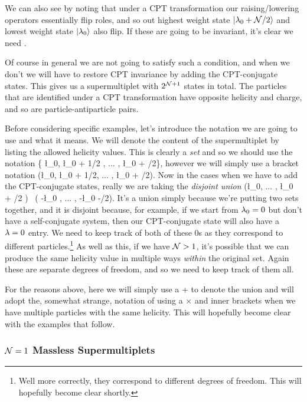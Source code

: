 \br 
    We can also see  by noting that under a CPT transformation our raising/lowering operators essentially flip roles, and so out highest weight state $\ket{\lambda_0 + \mathcal{N}/2}$ and lowest weight state $\ket{\lambda_0}$ also flip. If these are going to be invariant, it's clear we need .
\er 

Of course in general we are not going to satisfy such a condition, and when we don't we will have to restore CPT invariance by adding the CPT-conjugate states. This gives us a supermultiplet with $2^{\mathcal{N}+1}$ states in total. The particles that are identified under a CPT transformation have opposite helicity and charge, and so are particle-antiparticle pairs. 

Before considering specific examples, let's introduce the notation we are going to use and what it means. We will denote the content of the supermultiplet by listing the allowed helicity values. This is clearly a \textit{set} and so we should use the notation 
\bse 
    \{ \l_0, \l_0 + 1/2 , ... , \l_0 + \cN/2\},
\ese    
however we will simply use a bracket notation 
\bse 
    (\l_0, \l_0 + 1/2, ... , \l_0 + \cN/2). 
\ese 
Now in the cases when we have to add the CPT-conjugate states, really we are taking the \textit{disjoint union}
\bse 
    (\l_0, ... , \l_0 + \cN/2 ) \, \dot{\cup} ( -\l_0 , ... , -\l_0 -\cN/2).
\ese 
It's a union simply because we're putting two sets together, and it is disjoint because, for example, if we start from $\lambda_0=0$ but don't have a self-conjugate system, then our CPT-conjugate state will also have a $\lambda=0$ entry. We need to keep track of both of these $0$s as they correspond to different particles.\footnote{Well more correctly, they correspond to different degrees of freedom. This will hopefully become clear shortly.} As well as this, if we have $\mathcal{N}>1$, it's possible that we can produce the same helicity value in multiple ways \textit{within} the original set. Again these are separate degrees of freedom, and so we need to keep track of them all.

For the reasons above, here we will simply use a $+$ to denote the union and will adopt the, somewhat strange, notation of using a $\times$ and inner brackets when we have multiple particles with the same helicity. This will hopefully become clear with the examples that follow. 


\subsubsection{$\mathcal{N}=1$ Massless Supermultiplets}

